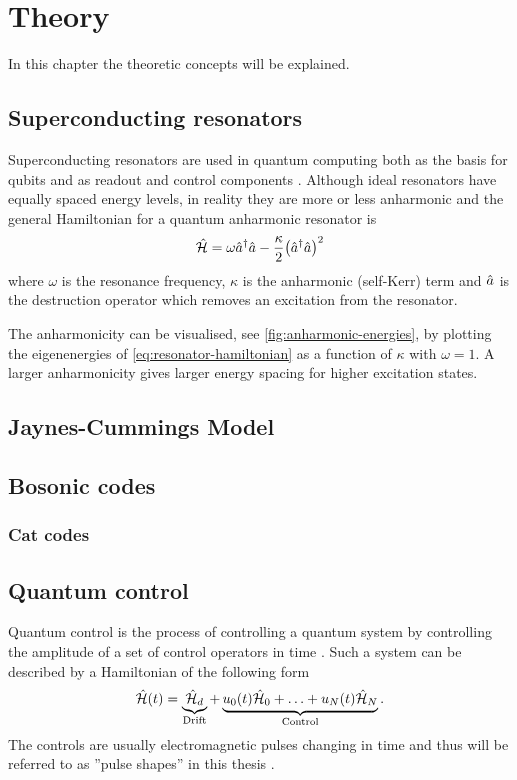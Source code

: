 \documentclass[main.tex]{subfiles}
\begin{document}
\chapter{Theory}
In this chapter the theoretic concepts will be explained.

\section{Superconducting resonators}
Superconducting resonators are used in quantum computing both as the basis for qubits and as readout and control components \cite{}. Although ideal resonators have equally spaced energy levels, in reality they are more or less anharmonic and the general Hamiltonian for a quantum anharmonic resonator is
\begin{equation}
    \hat{\mathcal{H}} = \omega \hat{a}^\dagger\hat{a} - \frac{\kappa}{2} \qty(\hat{a}^\dagger\hat{a})^2
    \label{eq:resonator-hamiltonian}
\end{equation}
where \(\omega\) is the resonance frequency, \(\kappa\) is the anharmonic (self-Kerr) term and \(\hat{a}\) is the destruction operator which removes an excitation from the resonator.

The anharmonicity can be visualised, see \cref{fig:anharmonic-energies}, by plotting the eigenenergies of \cref{eq:resonator-hamiltonian} as a function of \(\kappa\) with \(\omega=1\). A larger anharmonicity gives larger energy spacing for higher excitation states.


\section{Jaynes-Cummings Model}


\section{Bosonic codes}


\subsection{Cat codes}



\section{Quantum control}
Quantum control is the process of controlling a quantum system by controlling the amplitude of a set of control operators in time \cite{fisher_optimal_2010}. Such a system can be described \cite{fisher_optimal_2010} by a Hamiltonian of the following form
\begin{equation}
    \hat{\mathcal{H}}(t) = \underbrace{\hat{\mathcal{H}}_d}_{\text{Drift}} + \underbrace{u_0(t)\hat{\mathcal{H}}_0 + \dotsc + u_N(t)\hat{\mathcal{H}}_N}_{\text{Control}}.
\end{equation}
The controls are usually electromagnetic pulses changing in time and thus will be referred to as ''pulse shapes'' in this thesis \cite{fisher_optimal_2010}.
\end{document}
